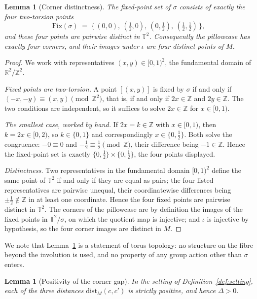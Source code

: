 \documentclass[11pt,a4paper]{article}
\newcommand{\T}{\mathbb{T}}
\newcommand{\R}{\mathbb{R}}
\newcommand{\Z}{\mathbb{Z}}
\newcommand{\dist}{\mathrm{dist}}
\theoremstyle{plain}
\newtheorem{lemma}[theorem]{Lemma}
\theoremstyle{definition}
\theoremstyle{remark}
\begin{document}
\begin{lemma}[Corner distinctness]\label{lem:corners}
The fixed-point set of $\sigma$ consists of exactly the four
two-torsion points
\[
\mathrm{Fix}(\sigma)
\;=\;
\bigl\{\, (0,0),\ (\tfrac12, 0),\ (0, \tfrac12),\ (\tfrac12, \tfrac12) \,\bigr\},
\]
and these four points are pairwise distinct in $\T^2$. Consequently
the pillowcase has exactly four corners, and their images under
$\iota$ are four distinct points of $M$.
\end{lemma}

\begin{proof}
We work with representatives $(x,y) \in [0,1)^2$, the fundamental
domain of $\R^2/\Z^2$.

\emph{Fixed points are two-torsion.} A point $[(x,y)]$ is fixed by
$\sigma$ if and only if $(-x,-y) \equiv (x,y) \pmod{\Z^2}$, that is,
if and only if $2x \in \Z$ and $2y \in \Z$. The two conditions are
independent, so it suffices to solve $2x \in \Z$ for $x \in [0,1)$.

\emph{The smallest case, worked by hand.} If $2x = k \in \Z$ with
$x \in [0,1)$, then $k = 2x \in [0,2)$, so $k \in \{0, 1\}$ and
correspondingly $x \in \{0, \tfrac12\}$. Both solve the congruence:
$-0 \equiv 0$ and $-\tfrac12 \equiv \tfrac12 \pmod{\Z}$, their
difference being $-1 \in \Z$. Hence the fixed-point set is exactly
$\{0, \tfrac12\} \times \{0, \tfrac12\}$, the four points displayed.

\emph{Distinctness.} Two representatives in the fundamental domain
$[0,1)^2$ define the same point of $\T^2$ if and only if they are
equal as pairs; the four listed representatives are pairwise unequal,
their coordinatewise differences being $\pm\tfrac12 \notin \Z$ in at
least one coordinate. Hence the four fixed points are pairwise
distinct in $\T^2$. The corners of the pillowcase are by definition
the images of the fixed points in $\T^2/\sigma$, on which the quotient
map is injective; and $\iota$ is injective by hypothesis, so the four
corner images are distinct in $M$.
\end{proof}

We note that Lemma~\ref{lem:corners} is a statement of torus topology:
no structure on the fibre beyond the involution is used, and no
property of any group action other than $\sigma$ enters.

\begin{lemma}[Positivity of the corner gap]\label{lem:positivity}
In the setting of Definition~\ref{def:setting}, each of the three
distances $\dist_M(c, c')$ is strictly positive, and hence
$\Delta > 0$.
\end{lemma}
\end{document}

